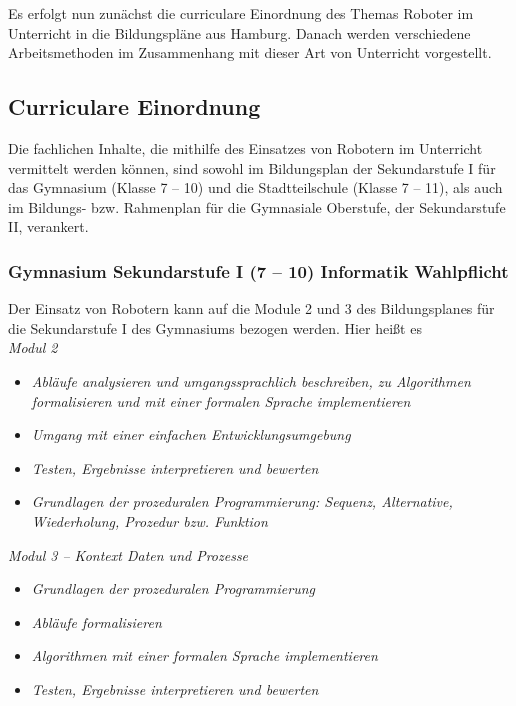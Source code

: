 \documentclass[paper=a4, pagesize, DIV=calc, BCOR=12.5mm, twoside=on, onecolumn=on, open = any, titlepage =on, parskip =half-, headsepline = on, footsepline = on, chapterprefix = on, appendixprefix = off, fontsize = 12pt, numbers = noenddot, abstract = on]{scrbook}
\numberwithin{equation}{chapter}
\theoremstyle{definition}
\theoremstyle{plain}
\theoremstyle{plain}
\theoremstyle{remark}
\theoremstyle{plain}
\theoremstyle{plain}
\begin{document}
Es erfolgt nun zunächst die curriculare Einordnung des Themas Roboter im Unterricht in die Bildungspläne aus Hamburg. Danach werden verschiedene Arbeitsmethoden im Zusammenhang mit dieser Art von Unterricht vorgestellt.

\subsection{Curriculare Einordnung}
Die fachlichen Inhalte, die mithilfe des Einsatzes von Robotern im Unterricht vermittelt werden können, sind sowohl im Bildungsplan der Sekundarstufe I für das Gymnasium (Klasse 7 -- 10) und die Stadtteilschule (Klasse 7 -- 11), als auch im Bildungs- bzw. Rahmenplan für die Gymnasiale Oberstufe, der Sekundarstufe II, verankert.

\subsubsection{Gymnasium Sekundarstufe I (7 -- 10) Informatik Wahlpflicht}
Der Einsatz von Robotern kann auf die Module 2 und 3 des Bildungsplanes für die Sekundarstufe I des Gymnasiums bezogen werden. Hier heißt es\\

\emph{Modul 2}
\begin{itemize}
\item \emph{Abläufe analysieren und umgangssprachlich beschreiben, zu Algorithmen formalisieren und mit einer formalen Sprache implementieren}
\item \emph{Umgang mit einer einfachen Entwicklungsumgebung}
\item \emph{Testen, Ergebnisse interpretieren und bewerten}
\item \emph{Grundlagen der prozeduralen Programmierung: Sequenz, Alternative, Wiederholung, Prozedur bzw. Funktion}
\end{itemize}

\emph{Modul 3 -- Kontext Daten und Prozesse}
\begin{itemize}
\item \emph{Grundlagen der prozeduralen Programmierung}
\item \emph{Abläufe formalisieren}
\item \emph{Algorithmen mit einer formalen Sprache implementieren}
\item \emph{Testen, Ergebnisse interpretieren und bewerten}
\end{itemize}

\end{document}
